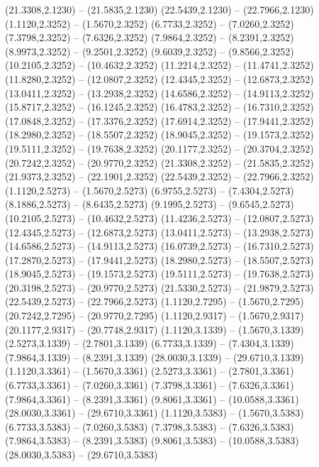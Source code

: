 {\begin{scope}[shift={(#1,#2)}]
    (21.3308,2.1230) -- (21.5835,2.1230)
    (22.5439,2.1230) -- (22.7966,2.1230)
    (1.1120,2.3252) -- (1.5670,2.3252)
    (6.7733,2.3252) -- (7.0260,2.3252)
    (7.3798,2.3252) -- (7.6326,2.3252)
    (7.9864,2.3252) -- (8.2391,2.3252)
    (8.9973,2.3252) -- (9.2501,2.3252)
    (9.6039,2.3252) -- (9.8566,2.3252)
    (10.2105,2.3252) -- (10.4632,2.3252)
    (11.2214,2.3252) -- (11.4741,2.3252)
    (11.8280,2.3252) -- (12.0807,2.3252)
    (12.4345,2.3252) -- (12.6873,2.3252)
    (13.0411,2.3252) -- (13.2938,2.3252)
    (14.6586,2.3252) -- (14.9113,2.3252)
    (15.8717,2.3252) -- (16.1245,2.3252)
    (16.4783,2.3252) -- (16.7310,2.3252)
    (17.0848,2.3252) -- (17.3376,2.3252)
    (17.6914,2.3252) -- (17.9441,2.3252)
    (18.2980,2.3252) -- (18.5507,2.3252)
    (18.9045,2.3252) -- (19.1573,2.3252)
    (19.5111,2.3252) -- (19.7638,2.3252)
    (20.1177,2.3252) -- (20.3704,2.3252)
    (20.7242,2.3252) -- (20.9770,2.3252)
    (21.3308,2.3252) -- (21.5835,2.3252)
    (21.9373,2.3252) -- (22.1901,2.3252)
    (22.5439,2.3252) -- (22.7966,2.3252)
    (1.1120,2.5273) -- (1.5670,2.5273)
    (6.9755,2.5273) -- (7.4304,2.5273)
    (8.1886,2.5273) -- (8.6435,2.5273)
    (9.1995,2.5273) -- (9.6545,2.5273)
    (10.2105,2.5273) -- (10.4632,2.5273)
    (11.4236,2.5273) -- (12.0807,2.5273)
    (12.4345,2.5273) -- (12.6873,2.5273)
    (13.0411,2.5273) -- (13.2938,2.5273)
    (14.6586,2.5273) -- (14.9113,2.5273)
    (16.0739,2.5273) -- (16.7310,2.5273)
    (17.2870,2.5273) -- (17.9441,2.5273)
    (18.2980,2.5273) -- (18.5507,2.5273)
    (18.9045,2.5273) -- (19.1573,2.5273)
    (19.5111,2.5273) -- (19.7638,2.5273)
    (20.3198,2.5273) -- (20.9770,2.5273)
    (21.5330,2.5273) -- (21.9879,2.5273)
    (22.5439,2.5273) -- (22.7966,2.5273)
    (1.1120,2.7295) -- (1.5670,2.7295)
    (20.7242,2.7295) -- (20.9770,2.7295)
    (1.1120,2.9317) -- (1.5670,2.9317)
    (20.1177,2.9317) -- (20.7748,2.9317)
    (1.1120,3.1339) -- (1.5670,3.1339)
    (2.5273,3.1339) -- (2.7801,3.1339)
    (6.7733,3.1339) -- (7.4304,3.1339)
    (7.9864,3.1339) -- (8.2391,3.1339)
    (28.0030,3.1339) -- (29.6710,3.1339)
    (1.1120,3.3361) -- (1.5670,3.3361)
    (2.5273,3.3361) -- (2.7801,3.3361)
    (6.7733,3.3361) -- (7.0260,3.3361)
    (7.3798,3.3361) -- (7.6326,3.3361)
    (7.9864,3.3361) -- (8.2391,3.3361)
    (9.8061,3.3361) -- (10.0588,3.3361)
    (28.0030,3.3361) -- (29.6710,3.3361)
    (1.1120,3.5383) -- (1.5670,3.5383)
    (6.7733,3.5383) -- (7.0260,3.5383)
    (7.3798,3.5383) -- (7.6326,3.5383)
    (7.9864,3.5383) -- (8.2391,3.5383)
    (9.8061,3.5383) -- (10.0588,3.5383)
    (28.0030,3.5383) -- (29.6710,3.5383)

\end{scope}}

